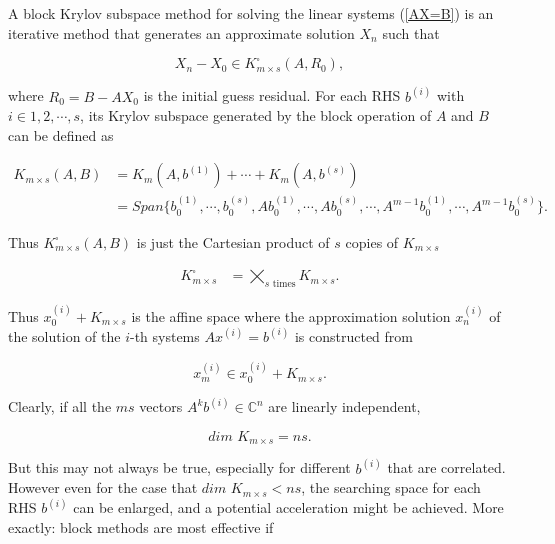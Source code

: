 A block Krylov subspace method for solving the linear systems (\ref{AX=B}) is an iterative method that generates an approximate solution $X_n$ such that

\begin{equation}
	X_n-X_0 \in K_{m\times s}^{\square}(A,R_0),
\end{equation}

where $R_0=B-AX_0$ is the initial guess residual. For each RHS $b^{(i)}$ with $i \in 1, 2, \cdots, s$, its Krylov subspace generated by the block operation of $A$ and $B$ can be defined as

\begin{equation}
\begin{aligned}
	K_{m\times s}(A,B) &= K_{m}(A,b^{(1)})+\cdots+ K_{m}(A,b^{(s)}) \\
&=Span\{b_0^{(1)},\cdots,b_0^{(s)}, Ab_0^{(1)},\cdots,Ab_0^{(s)},\cdots,A^{m-1}b_0^{(1)},\cdots,A^{m-1}b_0^{(s)} \}.
\end{aligned}
\end{equation}

Thus $K_{m\times s}^{\square}(A,B)$ is just the Cartesian product of $s$ copies of $K_{m\times s}$

\begin{equation}
\begin{aligned}
	K_{m\times s}^{\square}&=\bigtimes_{s\text{ times}}K_{m\times s}.
\end{aligned}
\end{equation}

Thus $x_0^{(i)}+K_{m\times s}$ is the affine space where the approximation solution $x_n^{(i)}$ of the solution of the $i$-th systems $Ax^{(i)}=b^{(i)}$ is constructed from

\begin{equation}
	x_m^{(i)} \in x_0^{(i)} + K_{m\times s}.
\end{equation}

Clearly, if all the $ms$ vectors $A^{k}b^{(i)} \in \mathbb{C}^{n}$ are linearly independent,

\begin{equation}
	\textit{dim }  K_{m\times s} = ns.
\end{equation} 

But this may not always be true, especially for different $b^{(i)}$ that are correlated. However even for the case that $\textit{dim }  K_{m\times s} < ns$, the searching space for each RHS $b^{(i)}$ can be enlarged, and a potential acceleration might be achieved. More exactly: block methods are most effective if

